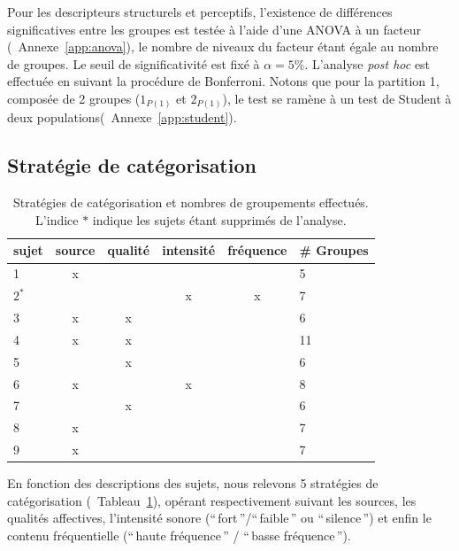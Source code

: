 Pour les descripteurs structurels et perceptifs, l'existence de différences significatives entre les groupes est testée à l'aide d'une ANOVA à un facteur (\cf~Annexe~\ref{app:anova}), le nombre de niveaux du facteur étant égale au nombre de groupes. Le seuil de significativité est fixé à $\alpha=5\%$. L'analyse \emph{post hoc} est effectuée en suivant la procédure de Bonferroni. Notons que pour la partition 1, composée de 2 groupes ($1_{P(1)}$ et $2_{P(1)}$), le test se ramène à un test de Student à deux populations(\cf~Annexe~\ref{app:student}).

\subsection{Stratégie de catégorisation}

\begin{table}[t]
\centering
\begin{tabular}{l|cccc|l} 
sujet    & source & qualité & intensité & fréquence & \# Groupes \\
\hline
    1    &   x    &         &        &           & 5  \\
    $2^*$&        &         &    x   &     x     & 7  \\
    3    &   x    &    x    &        &           & 6  \\
    4    &   x    &    x    &        &           & 11 \\        
    5    &        &    x    &        &           & 6  \\
    6    &   x    &         &    x   &           & 8  \\
    7    &        &    x    &        &           & 6  \\
    8    &   x    &         &        &           & 7  \\
    9    &   x    &         &        &           & 7  \\
\hline
\end{tabular}
\vspace{0.5mm}
\caption[Stratégies de catégorisation et nombres de groupements effectués]{Stratégies de catégorisation et nombres de groupements effectués. L'indice $*$ indique les sujets étant supprimés de l'analyse.}
\label{tab:StratSate}
\end{table}

En fonction des descriptions des sujets, nous relevons 5 stratégies de catégorisation (\cf~Tableau~\ref{tab:StratSate}), opérant respectivement suivant les sources, les qualités affectives, l'intensité sonore (``\,fort\,''/``\,faible\,'' ou ``\,silence\,'') et enfin le contenu fréquentielle (``\,haute fréquence\,'' / ``\,basse fréquence\,''). 

